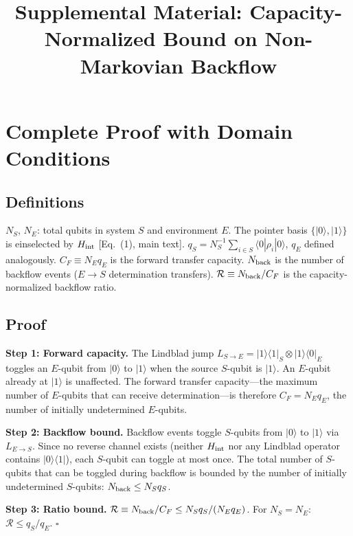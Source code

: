 \documentclass[aps,pra,onecolumn]{revtex4-2}
\begin{document}
\title{Supplemental Material: Capacity-Normalized Bound on Non-Markovian Backflow}

\maketitle

\section{Complete Proof with Domain Conditions}

\subsection{Definitions}

$N_S$, $N_E$: total qubits in system $S$ and environment $E$. The pointer basis $\{|0\rangle,|1\rangle\}$ is einselected by $H_{\rm int}$ [Eq.~(1), main text]. $q_S = N_S^{-1}\sum_{i\in S}\langle 0|\rho_i|0\rangle$, $q_E$ defined analogously. $C_F \equiv N_E q_E$ is the forward transfer capacity. $N_{\rm back}$ is the number of backflow events ($E \to S$ determination transfers). $\mathcal{R} \equiv N_{\rm back}/C_F$ is the capacity-normalized backflow ratio.

\subsection{Proof}

\textbf{Step 1: Forward capacity.} The Lindblad jump $L_{S\to E}=|1\rangle\langle 1|_S\otimes|1\rangle\langle 0|_E$ toggles an $E$-qubit from $|0\rangle$ to $|1\rangle$ when the source $S$-qubit is $|1\rangle$. An $E$-qubit already at $|1\rangle$ is unaffected. The forward transfer capacity---the maximum number of $E$-qubits that can receive determination---is therefore $C_F = N_E q_E$, the number of initially undetermined $E$-qubits.

\textbf{Step 2: Backflow bound.} Backflow events toggle $S$-qubits from $|0\rangle$ to $|1\rangle$ via $L_{E\to S}$. Since no reverse channel exists (neither $H_{\rm int}$ nor any Lindblad operator contains $|0\rangle\langle 1|$), each $S$-qubit can toggle at most once. The total number of $S$-qubits that can be toggled during backflow is bounded by the number of initially undetermined $S$-qubits: $N_{\rm back} \leq N_S q_S$.

\textbf{Step 3: Ratio bound.} $\mathcal{R} \equiv N_{\rm back}/C_F \leq N_S q_S/(N_E q_E)$. For $N_S = N_E$: $\mathcal{R} \leq q_S/q_E$. $\square$
\end{document}
